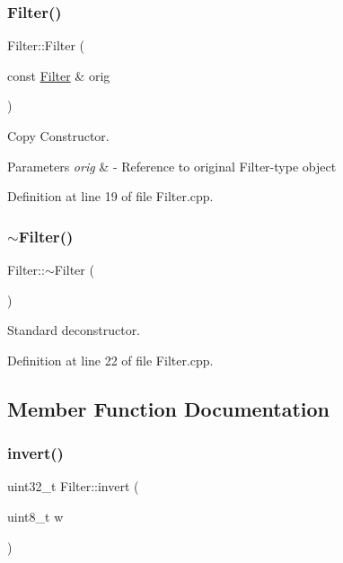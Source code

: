 \subsubsection{\texorpdfstring{Filter()}{Filter()}\hspace{0.1cm}{\footnotesize\ttfamily [2/2]}}
{\footnotesize\ttfamily Filter\+::\+Filter (\begin{DoxyParamCaption}\item[{const \mbox{\hyperlink{classFilter}{Filter}} \&}]{orig }\end{DoxyParamCaption})}



Copy Constructor. 


\begin{DoxyParams}{Parameters}
{\em orig} & -\/ Reference to original Filter-\/type object \\
\hline
\end{DoxyParams}


Definition at line 19 of file Filter.\+cpp.

\mbox{\label{classFilter_a502ee334d42eac3edbaf32b599f9c35e}} 
\subsubsection{\texorpdfstring{$\sim$Filter()}{~Filter()}}
{\footnotesize\ttfamily Filter\+::$\sim$\+Filter (\begin{DoxyParamCaption}{ }\end{DoxyParamCaption})\hspace{0.3cm}{\ttfamily [virtual]}}

Standard deconstructor. 

Definition at line 22 of file Filter.\+cpp.



\subsection{Member Function Documentation}
\mbox{\label{classFilter_a55f792b3f87991db5a5e666827d6214c}} 
\subsubsection{\texorpdfstring{invert()}{invert()}}
{\footnotesize\ttfamily uint32\+\_\+t Filter\+::invert (\begin{DoxyParamCaption}\item[{uint8\+\_\+t}]{w }\end{DoxyParamCaption})\hspace{0.3cm}{\ttfamily [static]}}




